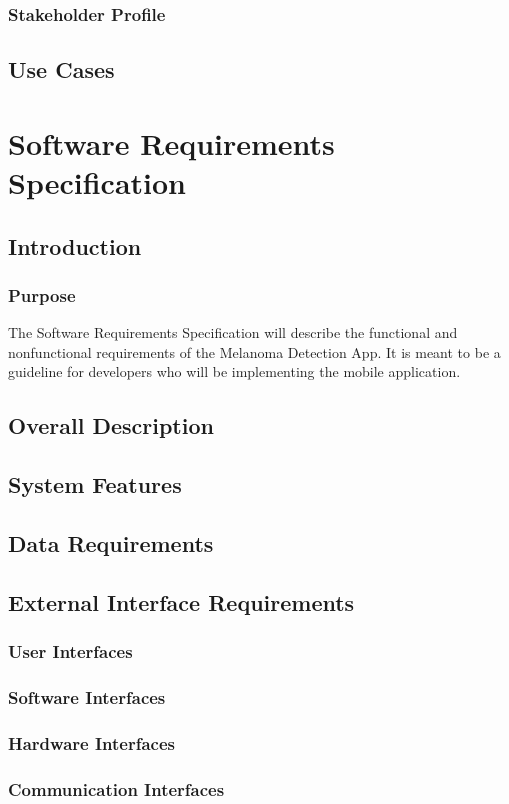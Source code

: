     \subsubsection{Stakeholder Profile}




    \subsection{Use Cases}
        


\section{Software Requirements Specification}

    \subsection{Introduction}
        \subsubsection{Purpose}

            The Software Requirements Specification will describe the functional and nonfunctional requirements of the Melanoma Detection App. It is meant to be a guideline for developers who will be implementing the mobile application.

    \subsection{Overall Description}
        

    \subsection{System Features}
        

    \subsection{Data Requirements}
    

    \subsection{External Interface Requirements}
        \subsubsection{User Interfaces}
        \subsubsection{Software Interfaces}
        \subsubsection{Hardware Interfaces}
        \subsubsection{Communication Interfaces}







